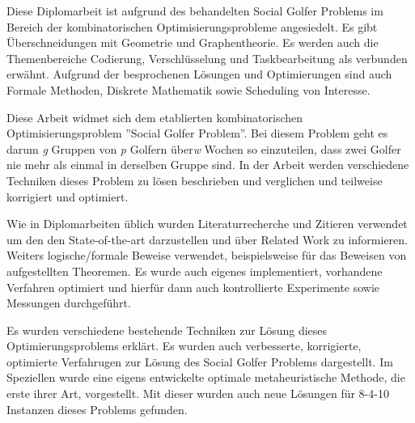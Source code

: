 
Diese Diplomarbeit ist aufgrund des behandelten Social Golfer Problems im Bereich der kombinatorischen Optimisierungsprobleme angesiedelt. Es gibt Überschneidungen mit Geometrie und Graphentheorie. Es werden auch die Themenbereiche Codierung, Verschlüsselung und Taskbearbeitung als verbunden erwähnt. Aufgrund der besprochenen Lösungen und Optimierungen sind auch Formale Methoden, Diskrete Mathematik sowie Scheduling von Interesse.\cite[Kap.~1]{Triska2008}

Diese Arbeit widmet sich dem etablierten kombinatorischen Optimisierungsproblem ''Social Golfer Problem''. Bei diesem Problem geht es darum \emph{g} Gruppen von \emph{p} Golfern über\emph{w} Wochen so einzuteilen, dass zwei Golfer nie mehr als einmal in derselben Gruppe sind. In der Arbeit werden verschiedene Techniken dieses Problem zu lösen beschrieben und verglichen und teilweise korrigiert und optimiert.\cite[Kap.~2-6]{Triska2008}

Wie in Diplomarbeiten üblich wurden Literaturrecherche und Zitieren verwendet um den den State-of-the-art darzustellen und über Related Work zu informieren. Weiters logische/formale Beweise verwendet, beispielsweise für das Beweisen von aufgestellten Theoremen. Es wurde auch eigenes implementiert, vorhandene Verfahren optimiert und hierfür dann auch kontrollierte Experimente sowie Messungen durchgeführt.\cite[Kap.~1,6]{Triska2008}

Es wurden verschiedene bestehende Techniken zur Lösung dieses Optimierungsproblems erklärt. Es wurden auch verbesserte, korrigierte, optimierte Verfahrugen zur Lösung des Social Golfer Problems dargestellt. Im Speziellen wurde eine eigens entwickelte optimale metaheuristische Methode, die erste ihrer Art, vorgestellt. Mit dieser wurden auch neue Lösungen für 8-4-10 Instanzen dieses Problems gefunden.\cite[Kap.~7]{Triska2008}

